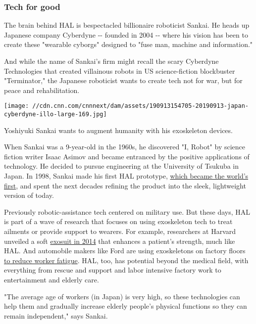 \hypertarget{tech-for-good}{%
\subsubsection{Tech for good}\label{tech-for-good}}

The brain behind HAL is bespectacled billionaire roboticist Sankai. He
heads up Japanese company Cyberdyne -\/- founded in 2004 -\/- where his
vision has been to create these "wearable cyborgs" designed to "fuse
man, machine and information."

And while the name of Sankai's firm might recall the scary Cyberdyne
Technologies that created villainous robots in US science-fiction
blockbuster "Terminator," the Japanese roboticist wants to create tech
not for war, but for peace and rehabilitation.

\texttt{[image: //cdn.cnn.com/cnnnext/dam/assets/190913154705-20190913-japan-cyberdyne-illo-large-169.jpg]}

Yoshiyuki Sankai wants to augment humanity with his exoskeleton devices.

When Sankai was a 9-year-old in the 1960s, he discovered "I, Robot" by
science fiction writer Isaac Asimov and became entranced by the positive
applications of technology. He decided to pursue engineering at the
University of Tsukuba in Japan. In 1998, Sankai made his first HAL
prototype,
\href{https://www.wipo.int/ipadvantage/en/details.jsp?id=2605}{which
became the world's first}, and spent the next decades refining the
product into the sleek, lightweight version of today.

Previously robotic-assistance tech centered on military use. But these
days, HAL is part of a wave of research that focuses on using
exoskeleton tech to treat ailments or provide support to wearers. For
example, researchers at Harvard unveiled a soft
\href{https://www.roboticsbusinessreview.com/health-medical/harvard_university_mobility_enhancing_soft_robotic_exosuit/}{exosuit
in 2014} that enhances a patient's strength, much like HAL. And
automobile makers like Ford are using exoskeletons on factory floors
\href{https://media.ford.com/content/fordmedia/fna/us/en/news/2018/08/07/ford-rolls-out-exoskeleton-wearable-technology-globally-to-help-.html}{to
reduce worker fatigue}. HAL, too, has potential beyond the medical
field, with everything from rescue and support and labor intensive
factory work to entertainment and elderly care.

"The average age of workers (in Japan) is very high, so these
technologies can help them and gradually increase elderly people's
physical functions so they can remain independent," says Sankai.


